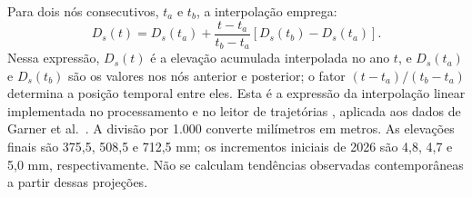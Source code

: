 \documentclass[12pt,a4paper]{article}
\begin{document}
Para dois nós consecutivos, $t_a$ e $t_b$, a interpolação emprega:
\begin{equation}
D_s(t)=D_s(t_a)+\frac{t-t_a}{t_b-t_a}\left[D_s(t_b)-D_s(t_a)\right].
\label{eq:interpolacao}
\end{equation}
Nessa expressão, $D_s(t)$ é a elevação acumulada interpolada no ano $t$, e $D_s(t_a)$ e $D_s(t_b)$ são os valores nos nós anterior e posterior; o fator $(t-t_a)/(t_b-t_a)$ determina a posição temporal entre eles. Esta é a expressão da interpolação linear implementada no processamento e no leitor de trajetórias \citep{studio2026}, aplicada aos dados de Garner et al.\ \citeyearpar{garner2021}. A divisão por 1.000 converte milímetros em metros. As elevações finais são 375,5, 508,5 e 712,5 mm; os incrementos iniciais de 2026 são 4,8, 4,7 e 5,0 mm, respectivamente. Não se calculam tendências observadas contemporâneas a partir dessas projeções.
\end{document}
